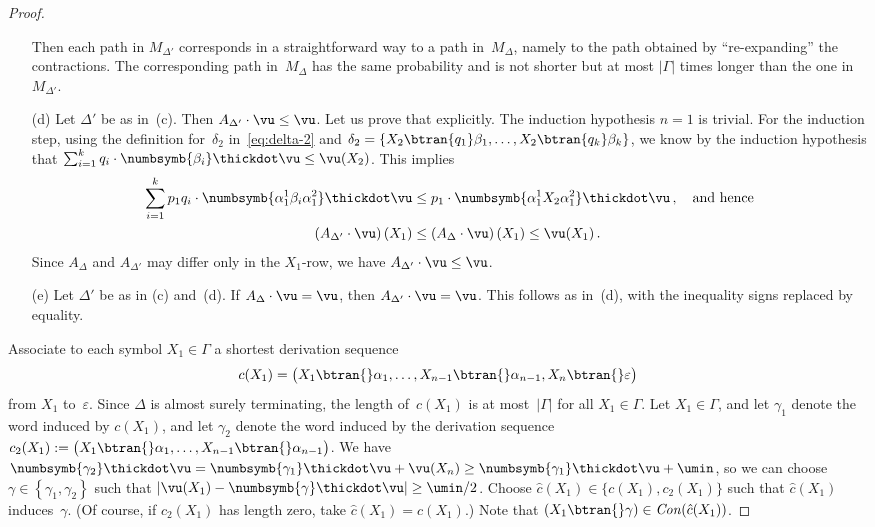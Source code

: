 \begin{proof}
\begin{itemize}
  Then each path in $M_{\Delta'}$ corresponds in a straightforward way to a path in~$M_\Delta$,
   namely to the path obtained by ``re-expanding'' the contractions.
  The corresponding path in~$M_\Delta$ has the same probability
   and is not shorter but at most $|\Gamma|$ times longer than the one in~$M_{\Delta'}$.
 \item[(d)]
  Let $\Delta'$ be as in~(c).
  Then $A_{\Delta'} \cdot \vu \le \vu$.
  Let us prove that explicitly.
  The induction hypothesis $n=1$ is trivial.
  For the induction step, using the definition for~$\delta_2$ in~\eqref{eq:delta-2} and
   $\delta_2 = \{ X_2 \btran{q_{1}} \beta_1, \ldots, X_2 \btran{q_{k}} \beta_k \}$,
   we know by the induction hypothesis that $\sum_{i=1}^k q_i \cdot \numbsymb{\beta_i} \thickdot \vu  \le \vu(X_2)$.
  This implies
   \begin{align*}
    \sum_{i=1}^k p_1 q_i \cdot \numbsymb{\alpha_1^1\beta_i\alpha_1^2} \thickdot \vu & \le p_1 \cdot \numbsymb{\alpha_1^1 X_2 \alpha_1^2} \thickdot \vu \,,
     \quad \text{and hence} \\
    \quad \left(A_{\Delta'} \cdot \vu\right)(X_1) & \le \left( A_{\Delta} \cdot \vu \right)(X_1) \le \vu(X_1)\,.
   \end{align*}
   Since $A_{\Delta}$ and $A_{\Delta'}$ may differ only in the $X_1$-row, we have $A_{\Delta'} \cdot \vu \le \vu$.
 \item[(e)]
  Let $\Delta'$ be as in (c) and~(d).
  If $A_{\Delta} \cdot \vu = \vu$, then $A_{\Delta'} \cdot \vu = \vu$.
  This follows as in~(d), with the inequality signs replaced by equality.
\end{itemize}

Associate to each symbol $X_1 \in \Gamma$ a shortest derivation sequence
 \[
  c(X_1) = \big( X_1 \btran{} \alpha_1, \ldots,  X_{n-1} \btran{} \alpha_{n-1}, X_n \btran{} \varepsilon \big)
 \]
  from $X_1$ to~$\varepsilon$.
Since $\Delta$ is almost surely terminating, the length of~$c(X_1)$ is at most~$|\Gamma|$ for all $X_1 \in \Gamma$.
Let $X_1 \in \Gamma$,
 and let $\gamma_1$ denote the word induced by $c(X_1)$,
 and let $\gamma_2$ denote the word induced by the derivation sequence $c_2(X_1) := \big( X_1 \btran{} \alpha_1, \ldots,  X_{n-1} \btran{} \alpha_{n-1} \big)$.
We have $\numbsymb{\gamma_2} \thickdot \vu =  \numbsymb{\gamma_1} \thickdot \vu + \vu(X_n) \ge \numbsymb{\gamma_1} \thickdot \vu + \umin$,
 so we can choose $\gamma \in \left\{\gamma_1, \gamma_2\right\}$ such that $|\vu(X_1) - \numbsymb{\gamma} \thickdot \vu| \ge \umin/2$.
Choose $\hat c(X_1) \in \{c(X_1), c_2(X_1)\}$ such that $\hat c(X_1)$ induces~$\gamma$.
(Of course, if $c_2(X_1)$ has length zero, take $\hat c(X_1) = c(X_1)$.)
Note that $(X_1 \btran{} \gamma) \in \Con(\hat c(X_1))$.


\end{proof}
